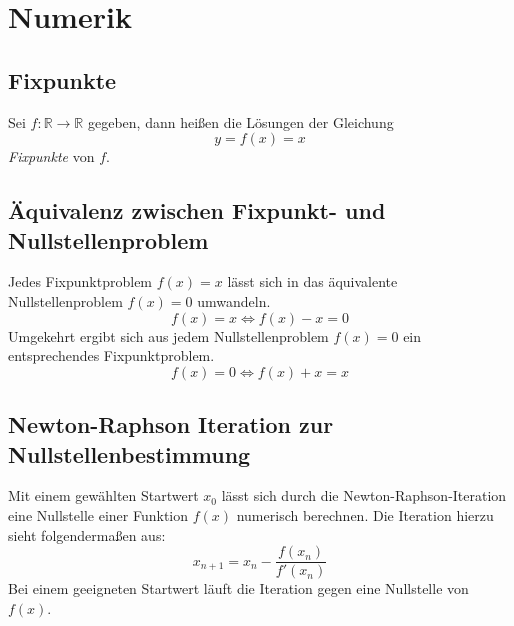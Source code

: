 \section{Numerik}
\label{sec:numerik}

\subsection{Fixpunkte}
\label{sub:fixpunkte}

Sei $f : \mathbb{R} \rightarrow \mathbb{R}$ gegeben, dann heißen die Lösungen der Gleichung 
\begin{equation}
	y = f(x) = x
\end{equation}
\emph{Fixpunkte} von $f$.

\subsection{\"{A}quivalenz zwischen Fixpunkt- und Nullstellenproblem}
\label{sub:aequivalenz_zwischen_fixpunkt_und_nullstellenproblem}

Jedes Fixpunktproblem $f(x) = x$ lässt sich in das äquivalente Nullstellenproblem $f(x) = 0$ umwandeln.
\begin{equation}
	f(x) = x \Leftrightarrow f(x) - x = 0
\end{equation}
Umgekehrt ergibt sich aus jedem Nullstellenproblem $f(x) = 0$ ein entsprechendes Fixpunktproblem.
\begin{equation}
	f(x) = 0 \Leftrightarrow f(x) + x = x
\end{equation}

\subsection{Newton-Raphson Iteration zur Nullstellenbestimmung}
\label{sub:newton_raphson_iteration_zur_nullstellenbestimmung}

Mit einem gewählten Startwert $x_0$ lässt sich durch die Newton-Raphson-Iteration eine 
Nullstelle einer Funktion $f(x)$ numerisch berechnen. Die Iteration hierzu sieht 
folgendermaßen aus:
\begin{equation}
	x_{n+1} = x_n - \frac{f(x_n)}{f'(x_n)}
\end{equation}
Bei einem geeigneten Startwert läuft die Iteration gegen eine Nullstelle von $f(x)$.